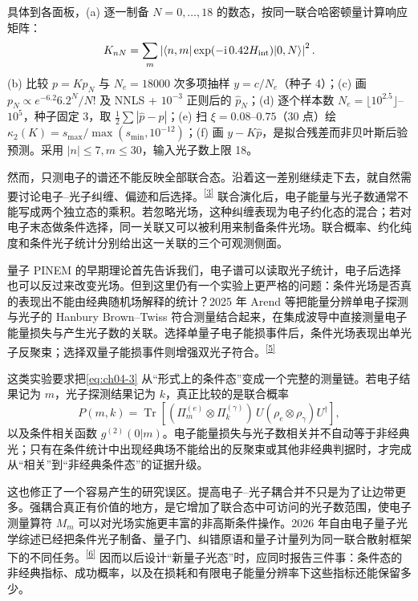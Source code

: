 具体到各面板，(a) 逐一制备 $N=0,\dots,18$ 的数态，按同一联合哈密顿量计算响应矩阵：\[K_{nN}=\sum_m\left|\langle n,m|\exp(-\mathrm{i}\,0.42H_{\rm int})|0,N\rangle\right|^2.\] (b) 比较 $p=Kp_N$ 与 $N_e=18000$ 次多项抽样 $y=c/N_e$（种子 4）；(c) 画 $p_N\propto e^{-6.2}6.2^N/N!$ 及 NNLS + $10^{-3}$ 正则后的 $\widehat p_N$；(d) 逐个样本数 $N_e=\lfloor10^{2.5}\rfloor$--$10^5$，种子固定 3，取 $\tfrac12\sum|\widehat p-p|$；(e) 扫 $\xi=0.08$--$0.75$（30 点）绘 $\kappa_2(K)=s_{\max}/\max(s_{\min},10^{-12})$；(f) 画 $y-K\widehat p$，是拟合残差而非贝叶斯后验预测。采用 $|n|\le7,m\le30$，输入光子数上限 18。


然而，只测电子的谱还不能反映全部联合态。沿着这一差别继续走下去，就自然需要讨论电子--光子纠缠、偏迹和后选择。\textsuperscript{\hyperref[ch04-ref3]{[3]}}
联合演化后，电子能量与光子数通常不能写成两个独立态的乘积。若忽略光场，这种纠缠表现为电子约化态的混合；若对电子末态做条件选择，同一关联又可以被利用来制备条件光场。联合概率、约化纯度和条件光子统计分别给出这一关联的三个可观测侧面。

量子 PINEM 的早期理论首先告诉我们，电子谱可以读取光子统计，电子后选择也可以反过来改变光场。但到这里仍有一个实验上更严格的问题：条件光场是否真的表现出不能由经典随机场解释的统计？2025 年 Arend 等把能量分辨单电子探测与光子的 Hanbury Brown--Twiss 符合测量结合起来，在集成波导中直接测量电子能量损失与产生光子数的关联。选择单量子电子能损事件后，条件光场表现出单光子反聚束；选择双量子能损事件则增强双光子符合。\textsuperscript{\hyperref[ch04-ref5]{[5]}}

这类实验要求把\cref{eq:ch04-3} 从“形式上的条件态”变成一个完整的测量链。若电子结果记为 $m$，光子探测结果记为 $k$，真正比较的是联合概率
\begin{equation}
P(m,k)=\operatorname{Tr}\!\left[(\Pi_m^{(e)}\otimes\Pi_k^{(\gamma)})\,U(\rho_e\otimes\rho_\gamma)U^\dagger\right],
\label{eq:ch04-joint-measurement}
\end{equation}
以及条件相关函数 $g^{(2)}(0|m)$。电子能量损失与光子数相关并不自动等于非经典光；只有在条件统计中出现经典场不能给出的反聚束或其他非经典判据时，才完成从“相关”到“非经典条件态”的证据升级。

这也修正了一个容易产生的研究误区。提高电子--光子耦合并不只是为了让边带更多。强耦合真正有价值的地方，是它增加了联合态中可访问的光子数范围，使电子测量算符 $M_m$ 可以对光场实施更丰富的非高斯条件操作。2026 年自由电子量子光学综述已经把条件光子制备、量子门、纠错原语和量子计量列为同一联合散射框架下的不同任务。\textsuperscript{\hyperref[ch04-ref6]{[6]}} 因而以后设计“新量子光态”时，应同时报告三件事：条件态的非经典指标、成功概率，以及在损耗和有限电子能量分辨率下这些指标还能保留多少。

